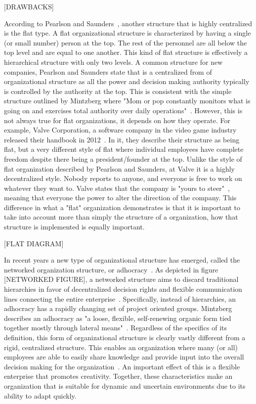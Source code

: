 [DRAWBACKS]

According to Pearlson and Saunders~\cite{pearlson2009}, another structure that is highly centralized is the flat type. A flat organizational structure is characterized by having a single (or small number) person at the top. The rest of the personnel are all below the top level and are equal to one another. This kind of flat structure is effectively a hierarchical structure with only two levels. A common structure for new companies, Pearlson and Saunders state that is a centralized from of organizational structure as all the power and decision making authority typically is controlled by the authority at the top. This is consistent with the simple structure outlined by Mintzberg where "Mom or pop constantly monitors what is going on and exercises total authority over daily operations"~\cite{Mintzberg1979}. However, this is not always true for flat organizations, it depends on how they operate. For example, Valve Corporation, a software company in the video game industry released their handbook in 2012~\cite{valveHandbook}. In it, they describe their structure as being flat, but a very different style of flat where individual employees have complete freedom despite there being a president/founder at the top. Unlike the style of flat organization described by Pearlson and Saunders, at Valve it is a highly decentralized style. Nobody reports to anyone, and everyone is free to work on whatever they want to. Valve states that the company is "yours to steer"~\cite{valveHandbook}, meaning that everyone the power to alter the direction of the company. This difference in what a "flat" organization demonstrates is that it is important to take into account more than simply the structure of a organization, how that structure is implemented is equally important. 

[FLAT DIAGRAM]

In recent years a new type of organizational structure has emerged, called the networked organization structure, or adhocracy~\cite{applegate1988,pearlson2009}. As depicted in figure [NETWORKED FIGURE], a networked structure aims to discard traditional hierarchies in favor of decentralized decision rights and flexible communication lines connecting the entire enterprise~\cite{applegate1988,pearlson2009}. Specifically, instead of hierarchies, an adhocracy has a rapidly changing set of project oriented groups. Mintzberg describes an adhocracy as "a loose, flexible, self-renewing organic form tied together mostly through lateral means"~\cite{Mintzberg1979}.  Regardless of the specifics of its definition, this form of organizational structure is clearly vastly different from a rigid, centralized structure. This enables an organization where many (or all) employees are able to easily share knowledge and provide input into the overall decision making for the organization~\cite{pearlson2009}. An important effect of this is a flexible enterprise that promotes creativity. Together, these characteristics make an organization that is suitable for dynamic and uncertain environments due to its ability to adapt quickly.

